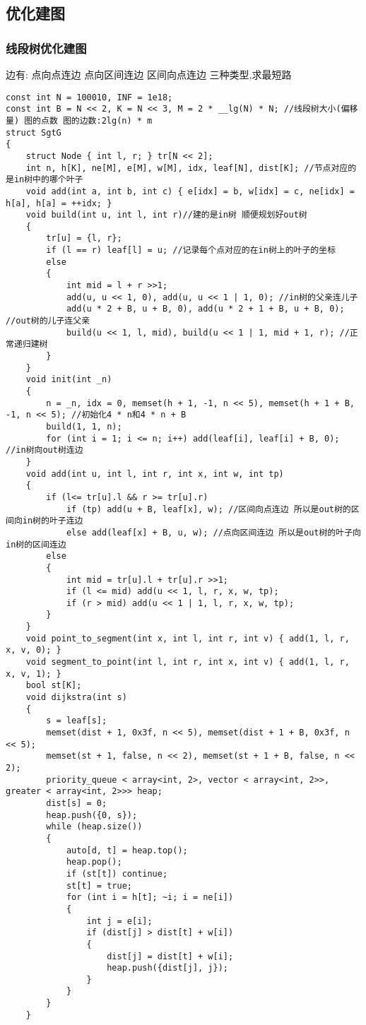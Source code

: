 \documentclass[a4paper, fontset=none]{ctexart}
\begin{document}
\subsection{优化建图}
\subsubsection{线段树优化建图}

边有: \quad 点向点连边 \quad 点向区间连边 \quad 区间向点连边 \quad 三种类型,求最短路


\begin{verbatim}
const int N = 100010, INF = 1e18;
const int B = N << 2, K = N << 3, M = 2 * __lg(N) * N; //线段树大小(偏移量) 图的点数 图的边数:2lg(n) * m
struct SgtG
{
    struct Node { int l, r; } tr[N << 2];
    int n, h[K], ne[M], e[M], w[M], idx, leaf[N], dist[K]; //节点对应的是in树中的哪个叶子
    void add(int a, int b, int c) { e[idx] = b, w[idx] = c, ne[idx] = h[a], h[a] = ++idx; }
    void build(int u, int l, int r)//建的是in树 顺便规划好out树
    {
        tr[u] = {l, r};
        if (l == r) leaf[l] = u; //记录每个点对应的在in树上的叶子的坐标
        else
        {
            int mid = l + r >>1;
            add(u, u << 1, 0), add(u, u << 1 | 1, 0); //in树的父亲连儿子
            add(u * 2 + B, u + B, 0), add(u * 2 + 1 + B, u + B, 0); //out树的儿子连父亲
            build(u << 1, l, mid), build(u << 1 | 1, mid + 1, r); //正常递归建树
        }
    }
    void init(int _n)
    {
        n = _n, idx = 0, memset(h + 1, -1, n << 5), memset(h + 1 + B, -1, n << 5); //初始化4 * n和4 * n + B
        build(1, 1, n);
        for (int i = 1; i <= n; i++) add(leaf[i], leaf[i] + B, 0); //in树向out树连边
    }
    void add(int u, int l, int r, int x, int w, int tp)
    {
        if (l<= tr[u].l && r >= tr[u].r)
            if (tp) add(u + B, leaf[x], w); //区间向点连边 所以是out树的区间向in树的叶子连边
            else add(leaf[x] + B, u, w); //点向区间连边 所以是out树的叶子向in树的区间连边
        else
        {
            int mid = tr[u].l + tr[u].r >>1;
            if (l <= mid) add(u << 1, l, r, x, w, tp);
            if (r > mid) add(u << 1 | 1, l, r, x, w, tp);
        }
    }
    void point_to_segment(int x, int l, int r, int v) { add(1, l, r, x, v, 0); }
    void segment_to_point(int l, int r, int x, int v) { add(1, l, r, x, v, 1); }
    bool st[K];
    void dijkstra(int s)
    {
        s = leaf[s];
        memset(dist + 1, 0x3f, n << 5), memset(dist + 1 + B, 0x3f, n << 5);
        memset(st + 1, false, n << 2), memset(st + 1 + B, false, n << 2);
        priority_queue < array<int, 2>, vector < array<int, 2>>, greater < array<int, 2>>> heap;
        dist[s] = 0;
        heap.push({0, s});
        while (heap.size())
        {
            auto[d, t] = heap.top();
            heap.pop();
            if (st[t]) continue;
            st[t] = true;
            for (int i = h[t]; ~i; i = ne[i])
            {
                int j = e[i];
                if (dist[j] > dist[t] + w[i])
                {
                    dist[j] = dist[t] + w[i];
                    heap.push({dist[j], j});
                }
            }
        }
    }


\end{verbatim}
\end{document}

